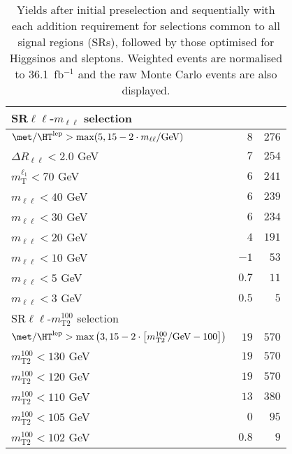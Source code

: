 \begin{table}
\begin{center}
\begin{tabular*}{\textwidth}{@{\extracolsep{\fill}}lrr}
\midrule
SR$\ell\ell$-$m_{\ell\ell}$ selection & \\ 
\midrule
$\met / \HT^\text{lep} > \text{max}(5, 15-2\cdot m_{\ell\ell}/\text{GeV})$ & $8$ & $276$   \\ 
    $\Delta R_{\ell\ell} < 2.0$ GeV & $7$ & $254$   \\ 
    $m_\text{T}^{\ell_1} < 70$ GeV & $6$ & $241$   \\ 
    $m_{\ell\ell} < 40$ GeV & $6$ & $239$   \\ 
    $m_{\ell\ell} < 30$ GeV & $6$ & $234$   \\ 
    $m_{\ell\ell} < 20$ GeV & $4$ & $191$   \\ 
    $m_{\ell\ell} < 10$ GeV & $-1$ & $53$   \\ 
    $m_{\ell\ell} < 5$ GeV & $0.7$ & $11$   \\ 
    $m_{\ell\ell} < 3$ GeV & $0.5$ & $5$   \\ 
    \midrule
SR$\ell\ell$-$m_\text{T2}^{100}$ selection & \\ 
\midrule
$\met / \HT^\text{lep} > \text{max}\left(3, 15-2\cdot \left[m_\text{T2}^{100}/\text{GeV} - 100\right]\right)$ & $19$ & $570$   \\ 
    $m_\text{T2}^{100} < 130$ GeV & $19$ & $570$   \\ 
    $m_\text{T2}^{100} < 120$ GeV & $19$ & $570$   \\ 
    $m_\text{T2}^{100} < 110$ GeV & $13$ & $380$   \\ 
    $m_\text{T2}^{100} < 105$ GeV & $0$ & $95$   \\ 
    $m_\text{T2}^{100} < 102$ GeV & $0.8$ & $9$   \\ 
    
  \bottomrule
  \end{tabular*}
\end{center}
\caption{ Yields after initial preselection and sequentially with each addition requirement 
for selections common to all signal regions (SRs), 
followed by those optimised for Higgsinos and sleptons. 
Weighted events are normalised to 36.1~fb$^{-1}$ and the raw Monte Carlo events are also displayed.
}
\label{tab:cutflow_Zttjets}
\end{table} 
  